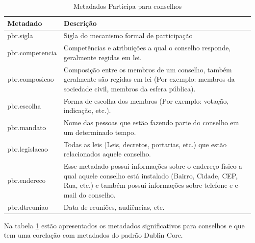 \begin{table}[H]
\begin{center}
    \begin{tabular}{ | l | p{10cm} |}
    \hline
    \textbf{Metadado} & \textbf{Descrição} \\ \hline
    pbr.sigla & Sigla do mecanismo formal de participação \\ \hline
    pbr.competencia & Competências e atribuições a qual o conselho responde, geralmente regidas em lei. \\ \hline
    pbr.composicao & Composição entre os membros de um conselho, também geralmente são regidas em lei (Por exemplo: membros da sociedade civil, membros da esfera pública). \\ \hline
    pbr.escolha & Forma de escolha dos membros (Por exemplo: votação, indicação, etc.). \\ \hline
    pbr.mandato & Nome das pessoas que estão fazendo parte do conselho em um determinado tempo. \\ \hline
    pbr.legislacao & Todas as leis (Leis, decretos, portarias, etc.) que estão relacionados aquele conselho. \\ \hline
    pbr.endereco & Esse metadado possui informações sobre o endereço físico a qual aquele conselho está instalado (Bairro, Cidade, CEP, Rua, etc.) e também possui informações sobre telefone e e-mail do conselho. \\ \hline
    pbr.dtreuniao & Data de reuniões, audiências, etc. \\ \hline
    \end{tabular}
    \caption{Metadados Participa para conselhos}
    \label{tab:metadata_pbr_conselhos}
\end{center}
\end{table}


Na tabela \ref{tab:metadata_pbr_conselhos} estão apresentados os metadados significativos para conselhos e que tem uma corelação com metadados do padrão Dublin Core.

